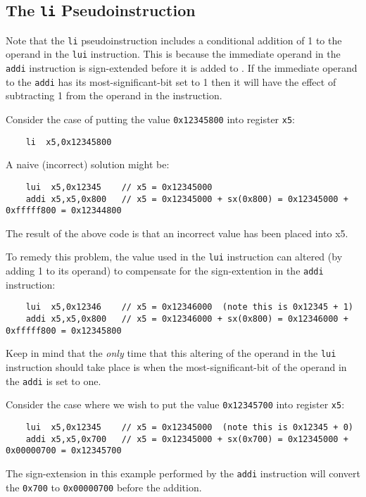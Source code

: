 \subsection{The {\tt li} Pseudoinstruction}

Note that the {\tt li} pseudoinstruction includes a conditional addition of 1 to the operand
in the {\tt lui} instruction.  This is because the immediate operand in the
{\tt addi} instruction is sign-extended before it is added to \verb@rd@.
If the immediate operand to the {\tt addi} has its most-significant-bit set to 1 then
it will have the effect of subtracting 1 from the operand in the \verb@lui@ instruction.

Consider the case of putting the value {\tt 0x12345800} into register {\tt x5}:

{\small
\begin{verbatim}
    li  x5,0x12345800
\end{verbatim}
}
{\color{red}
A naive (incorrect) solution might be:
{\small
\begin{verbatim}
    lui  x5,0x12345    // x5 = 0x12345000
    addi x5,x5,0x800   // x5 = 0x12345000 + sx(0x800) = 0x12345000 + 0xfffff800 = 0x12344800
\end{verbatim}
}
The result of the above code is that an incorrect value has been placed into x5.  
}

To remedy this problem, the value used in the {\tt lui} instruction can altered 
(by adding 1 to its operand) to compensate for the sign-extention in the {\tt addi} 
instruction:
{\small
\begin{verbatim}
    lui  x5,0x12346    // x5 = 0x12346000  (note this is 0x12345 + 1)
    addi x5,x5,0x800   // x5 = 0x12346000 + sx(0x800) = 0x12346000 + 0xfffff800 = 0x12345800
\end{verbatim}
}
Keep in mind that the {\em only} time that this altering of the operand in the {\tt lui}
instruction should take place is when the most-significant-bit of the operand in the
{\tt addi} is set to one.

Consider the case where we wish to put the value {\tt 0x12345700} into register {\tt x5}:
{\small
\begin{verbatim}
    lui  x5,0x12345    // x5 = 0x12345000  (note this is 0x12345 + 0)
    addi x5,x5,0x700   // x5 = 0x12345000 + sx(0x700) = 0x12345000 + 0x00000700 = 0x12345700
\end{verbatim}
}
The sign-extension in this example performed by the {\tt addi} instruction will convert the
{\tt 0x700} to {\tt 0x00000700} before the addition.

